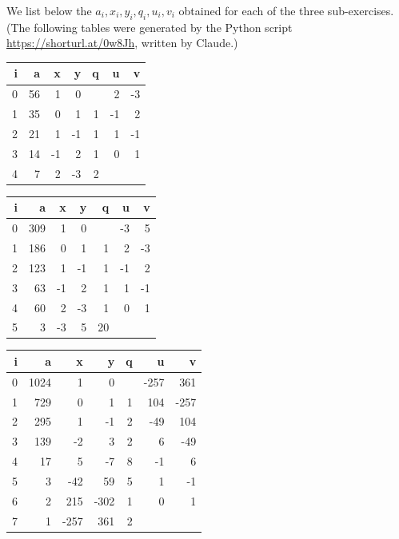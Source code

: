 \documentclass[12pt,letterpaper]{article}
\theoremstyle{definition}
\begin{document}
We list below the $a_i,x_i,y_i,q_i,u_i,v_i$ obtained for each of the three sub-exercises. (The following tables were generated by the Python script \url{https://shorturl.at/0w8Jh}, written by Claude.) %

\begin{table}[H]
    \centering
    \begin{tabular}{|r|r|r|r|r|r|r|}
    \hline
    i & a  &  x &  y & q &  u &  v \\ \hline
    0 & 56 &  1 &  0 &   &  2 & -3 \\ \hline
    1 & 35 &  0 &  1 & 1 & -1 &  2 \\ \hline
    2 & 21 &  1 & -1 & 1 &  1 & -1 \\ \hline
    3 & 14 & -1 &  2 & 1 &  0 &  1 \\ \hline
    4 &  7 &  2 & -3 & 2 &    &    \\ \hline
    \end{tabular}
\end{table}

\begin{table}[htbp]
    \centering
    \begin{tabular}{|r|r|r|r|r|r|r|}
    \hline
    i & a  &  x &  y & q &  u &  v \\ \hline
    0 & 309 & 1 & 0 &  & -3 & 5 \\ \hline
    1 & 186 & 0 & 1 & 1 & 2 & -3 \\ \hline
    2 & 123 & 1 & -1 & 1 & -1 & 2 \\ \hline
    3 & 63 & -1 & 2 & 1 & 1 & -1 \\ \hline
    4 & 60 & 2 & -3 & 1 & 0 & 1 \\ \hline
    5 & 3 & -3 & 5 & 20 &  &  \\ \hline
    \end{tabular}
\end{table}

\begin{table}[H]
    \centering
    \begin{tabular}{|r|r|r|r|r|r|r|}
    \hline
    i & a  &  x &  y & q &  u &  v \\ \hline
    0 & 1024 & 1 & 0 &  & -257 & 361 \\ \hline
    1 & 729 & 0 & 1 & 1 & 104 & -257 \\ \hline
    2 & 295 & 1 & -1 & 2 & -49 & 104 \\ \hline
    3 & 139 & -2 & 3 & 2 & 6 & -49 \\ \hline
    4 & 17 & 5 & -7 & 8 & -1 & 6 \\ \hline
    5 & 3 & -42 & 59 & 5 & 1 & -1 \\ \hline
    6 & 2 & 215 & -302 & 1 & 0 & 1 \\ \hline
    7 & 1 & -257 & 361 & 2 &  &  \\ \hline
    \end{tabular}
\end{table}
\end{document}

